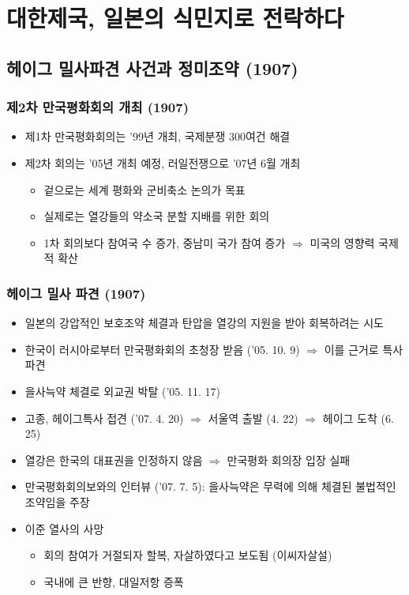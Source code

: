 \section{대한제국, 일본의 식민지로 전락하다}

\subsection{헤이그 밀사파견 사건과 정미조약 (1907)}

\subsubsection*{제2차 만국평화회의 개최 (1907)}

\begin{itemize}
    \item 제1차 만국평화회의는 '99년 개최, 국제분쟁 300여건 해결
    \item 제2차 회의는 '05년 개최 예정, 러일전쟁으로 '07년 6월 개최
    \begin{itemize}
        \item 겉으로는 세계 평화와 군비축소 논의가 목표
        \item 실제로는 열강들의 약소국 분할 지배를 위한 회의
        \item 1차 회의보다 참여국 수 증가, 중남미 국가 참여 증가 $\Rightarrow$ 미국의 영향력 국제적 확산
    \end{itemize}
\end{itemize}

\subsubsection*{헤이그 밀사 파견 (1907)}

\begin{itemize}
    \item 일본의 강압적인 보호조약 체결과 탄압을 열강의 지원을 받아 회복하려는 시도
    \item 한국이 러시아로부터 만국평화회의 초청장 받음 ('05. 10. 9) $\Rightarrow$ 이를 근거로 특사 파견
    \item 을사늑약 체결로 외교권 박탈 ('05. 11. 17)
    \item 고종, 헤이그특사 접견 ('07. 4. 20) $\Rightarrow$ 서울역 출발 (4. 22) $\Rightarrow$ 헤이그 도착 (6. 25)
    \item 열강은 한국의 대표권을 인정하지 않음 $\Rightarrow$ 만국평화 회의장 입장 실패
    \item 만국평화회의보와의 인터뷰 ('07. 7. 5): 을사늑약은 무력에 의해 체결된 불법적인 조약임을 주장
    \item 이준 열사의 사망
    \begin{itemize}
        \item 회의 참여가 거절되자 할복, 자살하였다고 보도됨 (이씨자살설)
        \item 국내에 큰 반향, 대일저항 증폭
    \end{itemize}
\end{itemize}

